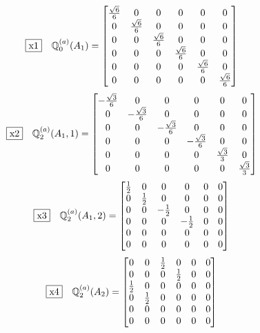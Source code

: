 \documentclass[fleqn,10pt,landscape]{jsarticle}
\begin{document}
\begin{dmath*}
\fbox{x1}\quad \mathbb{Q}_{0}^{(a)}(A_{1})=\begin{bmatrix} \frac{\sqrt{6}}{6} & 0 & 0 & 0 & 0 & 0 \\ 0 & \frac{\sqrt{6}}{6} & 0 & 0 & 0 & 0 \\ 0 & 0 & \frac{\sqrt{6}}{6} & 0 & 0 & 0 \\ 0 & 0 & 0 & \frac{\sqrt{6}}{6} & 0 & 0 \\ 0 & 0 & 0 & 0 & \frac{\sqrt{6}}{6} & 0 \\ 0 & 0 & 0 & 0 & 0 & \frac{\sqrt{6}}{6} \end{bmatrix}
\end{dmath*}
\begin{dmath*}
\fbox{x2}\quad \mathbb{Q}_{2}^{(a)}(A_{1},1)=\begin{bmatrix} - \frac{\sqrt{3}}{6} & 0 & 0 & 0 & 0 & 0 \\ 0 & - \frac{\sqrt{3}}{6} & 0 & 0 & 0 & 0 \\ 0 & 0 & - \frac{\sqrt{3}}{6} & 0 & 0 & 0 \\ 0 & 0 & 0 & - \frac{\sqrt{3}}{6} & 0 & 0 \\ 0 & 0 & 0 & 0 & \frac{\sqrt{3}}{3} & 0 \\ 0 & 0 & 0 & 0 & 0 & \frac{\sqrt{3}}{3} \end{bmatrix}
\end{dmath*}
\begin{dmath*}
\fbox{x3}\quad \mathbb{Q}_{2}^{(a)}(A_{1},2)=\begin{bmatrix} \frac{1}{2} & 0 & 0 & 0 & 0 & 0 \\ 0 & \frac{1}{2} & 0 & 0 & 0 & 0 \\ 0 & 0 & - \frac{1}{2} & 0 & 0 & 0 \\ 0 & 0 & 0 & - \frac{1}{2} & 0 & 0 \\ 0 & 0 & 0 & 0 & 0 & 0 \\ 0 & 0 & 0 & 0 & 0 & 0 \end{bmatrix}
\end{dmath*}
\begin{dmath*}
\fbox{x4}\quad \mathbb{Q}_{2}^{(a)}(A_{2})=\begin{bmatrix} 0 & 0 & \frac{1}{2} & 0 & 0 & 0 \\ 0 & 0 & 0 & \frac{1}{2} & 0 & 0 \\ \frac{1}{2} & 0 & 0 & 0 & 0 & 0 \\ 0 & \frac{1}{2} & 0 & 0 & 0 & 0 \\ 0 & 0 & 0 & 0 & 0 & 0 \\ 0 & 0 & 0 & 0 & 0 & 0 \end{bmatrix}
\end{dmath*}
\end{document}
